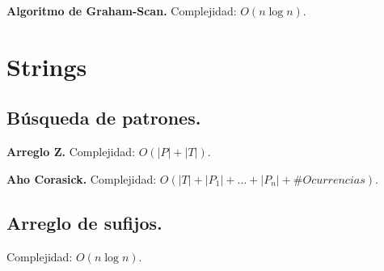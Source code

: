 \documentclass[10pt, letterpaper, twoside]{article}
\begin{document}
\textbf{Algoritmo de Graham-Scan.} Complejidad: $O(n \log n)$.




\section{Strings}

\subsection{Búsqueda de patrones.}

\textbf{Arreglo Z.} Complejidad: $O(|P| + |T|)$.



\bigskip

\textbf{Aho Corasick.} Complejidad: $O(|T| + |P_1| + \ldots + |P_n| + \#Ocurrencias)$.



\subsection{Arreglo de sufijos.}

Complejidad: $O(n\log n)$.



\end{document}
